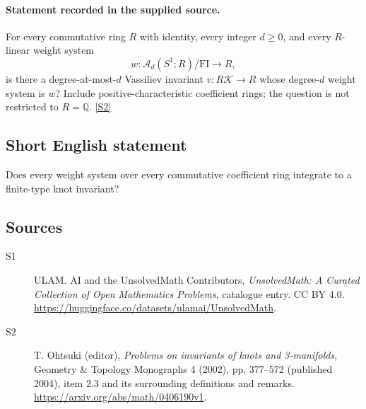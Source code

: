 \documentclass[11pt]{article}
\newcommand{\sref}[2]{\hyperlink{source:#1:#2}{[S#2]}}
\begin{document}
\paragraph{Statement recorded in the supplied source.}
For every commutative ring $R$ with identity, every integer $d\ge0$, and every $R$-linear weight system
\[w:\mathcal A_d(S^1;R)/\mathrm{FI}\longrightarrow R,\]
is there a degree-at-most-$d$ Vassiliev invariant $v:R\mathcal K\to R$ whose degree-$d$ weight system is $w$? Include positive-characteristic coefficient rings; the question is not restricted to $R=\mathbb Q$. \sref{statement}{2}
\subsection{Short English statement}
Does every weight system over every commutative coefficient ring integrate to a finite-type knot invariant?
\subsection{Sources}
\begin{description}
\item[\hypertarget{source:statement:1}{S1}] ULAM. AI and the UnsolvedMath Contributors, \emph{UnsolvedMath: A Curated Collection of Open Mathematics Problems}, catalogue entry. CC BY 4.0. \url{https://huggingface.co/datasets/ulamai/UnsolvedMath}.
\item[\hypertarget{source:statement:2}{S2}] T. Ohtsuki (editor), \emph{Problems on invariants of knots and 3-manifolds}, Geometry \& Topology Monographs 4 (2002), pp. 377--572 (published 2004), item 2.3 and its surrounding definitions and remarks. \url{https://arxiv.org/abs/math/0406190v1}.
\end{description}
\label{end:statement}
\end{document}
